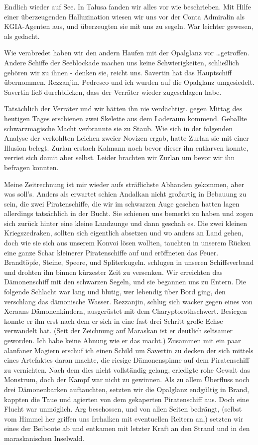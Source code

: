Endlich wieder auf See. In Talusa fanden wir alles vor wie beschrieben. Mit Hilfe einer überzeugenden Halluzination wiesen wir uns vor der Conta Admiralin als KGIA-Agenten aus, und überzeugten sie mit uns zu segeln. War leichter gewesen, als gedacht.

Wie verabredet haben wir den andern Haufen mit der Opalglanz vor \dots getroffen. Andere Schiffe der Seeblockade machen uns keine Schwierigkeiten, schließlich gehören wir zu ihnen - denken sie, reicht uns.
Savertin hat das Hauptschiff übernommen. Rezzanjin, Pedresco und ich wurden auf die Opalglanz umgesiedelt. Savertin ließ durchblicken, dass der Verräter wieder zugeschlagen habe.

Tatsächlich der Verräter und wir hätten ihn nie verdächtigt. gegen Mittag des heutigen Tages erschienen zwei Skelette aus dem Laderaum kommend. Geballte schwarzmagische Macht verbrannte sie zu Staub. Wie sich in der folgenden Analyse der verkohlten Leichen zweier Novizen ergab, hatte Zurlan sie mit einer Illusion belegt. Zurlan erstach Kalmann noch bevor dieser ihn entlarven konnte, verriet sich damit aber selbst. Leider brachten wir Zurlan um bevor wir ihn befragen konnten.

Meine Zeitrechnung ist mir wieder aufs sträflichste Abhanden gekommen, aber was soll's. Anders als erwartet schien Andalkan nicht großartig in Bebauung zu sein, die zwei Piratenschiffe, die wir im schwarzen Auge gesehen hatten lagen allerdings tatsächlich in der Bucht. Sie schienen uns bemerkt zu haben und zogen sich zurück hinter eine kleine Landzunge und dann geschah es. Die zwei kleinen Kriegszedraken, sollten sich eigentlich absetzen und wo anders an Land gehen, doch wie sie sich aus unserem Konvoi lösen wollten, tauchten in unserem Rücken eine ganze Schar kleinerer Piratenschiffe auf und eröffneten das Feuer. Brandtöpfe, Steine, Speere, und Spliterkugeln. schlugen in unseren Schiffsverband und drohten ihn binnen kürzester Zeit zu versenken. Wir erreichten das Dämonenschiff mit den schwarzen Segeln, und sie begannen uns zu Entern. Die folgende Schlacht war lang und blutig, wer lebendig über Bord ging, den verschlang das dämonische Wasser. Rezzanjin, schlug sich wacker gegen eines von Xeraans Dämonenkindern, ausgerüstet mit dem Charyptorothschwert. Besiegen konnte er ihn erst nach dem er sich in eine fast drei Schritt große Echse verwandelt hat. (Seit der Zeichnung auf Maraskan ist er deutlich seltsamer geworden. Ich habe keine Ahnung wie er das macht.) Zusammen mit ein paar alanfaner Magiern erschuf ich einen Schild um Savertin zu decken der sich mittels eines Artefaktes daran machte, die riesige Dämonenspinne auf dem Piratenschiff zu vernichten. Nach dem dies nicht vollständig gelang, erledigte rohe Gewalt das Monstrum, doch der Kampf war nicht zu gewinnen. Als zu allem Überfluss noch drei Dämonenbarken auftauchten, setzten wir die Opalglanz endgültig in Brand, kappten die Taue und agierten von dem gekaperten Piratenschiff aus. Doch eine Flucht war unmöglich. Arg beschossen, und von allen Seiten bedrängt, (selbst vom Himmel her griffen uns Irrhalken mit eventuellen Reitern an,) setzten wir eines der Beiboote ab und entkamen mit letzter Kraft an den Strand und in den maraskanischen Inselwald.

